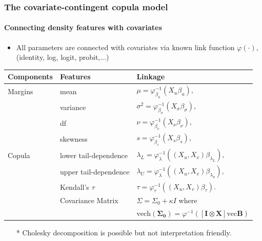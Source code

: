 \documentclass{beamer}
\begin{document}
\begin{frame}%
  \frametitle{The covariate-contingent copula model}
  \framesubtitle{Connecting density features with covariates}

  \begin{itemize}
  \item All parameters are connected with covariates via known link function
    $\varphi(\cdot)$, (identity, log, logit, probit,...)
  \end{itemize}
  \begin{center}
    \begin{tabular}{lll}
      \toprule
      Components & Features & Linkage\\
      \midrule
      \small{Margins}&mean&$\mu = \varphi_{\beta_u}^{-1}(X_u\beta_u),$\\
                 &variance&$\sigma^2 = \varphi_{\beta_\sigma}^{-1}(X_\sigma\beta_\sigma),$ \\
                 &df&$\nu = \varphi_{\beta_\nu}^{-1}(X_\nu\beta_\nu),$\\
                 &skewness&$s = \varphi_{\beta_s}^{-1}(X_s\beta_s),$\\
      \small{Copula} &lower tail-dependence&$\lambda_L = \varphi_{\lambda}^{-1}((X_u,X_v)\beta_{\lambda_L}),$\\
                 &upper tail-dependence&$\lambda_U = \varphi_{\lambda}^{-1}((X_u,X_v)\beta_{\lambda_u}),$\\
                 &Kendall's $\tau$& $\tau=\varphi_{\tau}^{-1}((X_u,X_v)\beta_\tau).$\\
                 &Covariance Matrix\color{blue}{*}& $\Sigma=\Sigma_0 + \kappa I$ where\\
                 &&\hspace{0.4cm}$\mathrm{vech}(\bm{\Sigma_0}) = \varphi^{-1}([\bm{I}\otimes \bm{X}]\mathrm{vec}\bm{B})$\\
      \bottomrule
    \end{tabular}
    \begin{itemize}
    \item [*] \small{Cholesky decomposition {\color{blue}\citep{huang2007estimation}} is
        possible but not interpretation friendly.}
    \end{itemize}
  \end{center}


  \begin{align*}
  \end{align*}

\end{frame}
\end{document}
